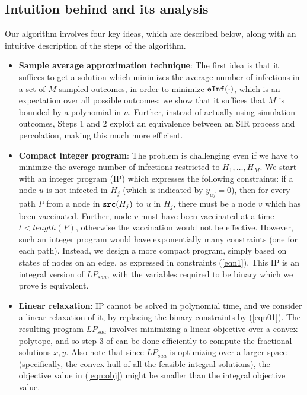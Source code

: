 \subsection{Intuition behind \algo{} and its analysis}

Our algorithm involves four key ideas, which are described below, along with an intuitive description of
the steps of the algorithm.
\begin{itemize}[leftmargin=0.1in, noitemsep, topsep=0pt]
\item
\textbf{Sample average approximation technique}: 
The first idea is that it suffices to get a solution which minimizes the average number of
infections in a set of $M$ sampled outcomes, in order to minimize $\texttt{eInf}(\cdot)$, which is an expectation
over all possible outcomes; we show that it suffices that $M$ is bounded by a polynomial in $n$.
Further, instead of actually using simulation outcomes, Steps 1 and 2 exploit an equivalence between an
SIR process and percolation, making this much more efficient.
\item
\textbf{Compact integer program}:
The problem is challenging even if we have to minimize the average number of infections restricted to
$H_1,\ldots,H_M$. We start with an integer program (IP) which expresses the following constraints: if a node $u$ is not infected in $H_j$
(which is indicated by $y_{uj}=0$), then for every path $P$ from a node in $\texttt{src}(H_j)$ to $u$ in $H_j$, there must be
a node $v$ which has been vaccinated. Further, node $v$ must have been vaccinated at a time $t< length(P)$, otherwise the
vaccination would not be effective. 
However, such an integer program would have exponentially many constraints (one for each path).
Instead, we design a more compact program,
simply based on states of nodes on an edge, as expressed in constraints (\ref{eqn1}).
This IP is an  integral version of $LP_{saa}$, with the variables required to be binary
which we prove is equivalent.
\item
\textbf{Linear relaxation}:
IP cannot be solved in polynomial time, and we consider a linear relaxation of it, by replacing the binary constraints
by (\ref{eqn01}). The resulting program $LP_{saa}$ involves minimizing a linear objective over a convex polytope,
and so step 3 of \algo{} can be done efficiently to compute the fractional solutions $x, y$.
Also note that since $LP_{saa}$ is optimizing over a larger space (specifically, the convex hull of all the
feasible integral solutions), the objective value in (\ref{eqn:obj}) might be smaller than the integral objective value.

\end{itemize}
